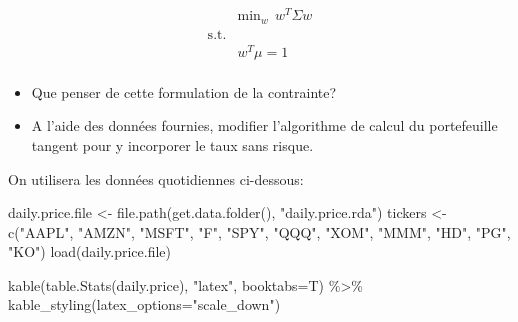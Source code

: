 \documentclass[
]{article}
\newenvironment{Shaded}{\begin{snugshade}}{\end{snugshade}}
\newcommand{\AttributeTok}[1]{\textcolor[rgb]{0.77,0.63,0.00}{#1}}
\newcommand{\FunctionTok}[1]{\textcolor[rgb]{0.00,0.00,0.00}{#1}}
\newcommand{\NormalTok}[1]{#1}
\newcommand{\OtherTok}[1]{\textcolor[rgb]{0.56,0.35,0.01}{#1}}
\newcommand{\SpecialCharTok}[1]{\textcolor[rgb]{0.00,0.00,0.00}{#1}}
\newcommand{\StringTok}[1]{\textcolor[rgb]{0.31,0.60,0.02}{#1}}
\providecommand{\tightlist}{%
  \setlength{\itemsep}{0pt}\setlength{\parskip}{0pt}}
\begin{document}
\[
\begin{aligned}
    & \mbox{min}_w \ \   w^T \Sigma w \\
    \mbox{s.t.} & \\
    & w^T \mu = 1 \\
\end{aligned}
\]

\begin{itemize}
\tightlist
\item
  Que penser de cette formulation de la contrainte?
\item
  A l'aide des données fournies, modifier l'algorithme de calcul du
  portefeuille tangent pour y incorporer le taux sans risque.
\end{itemize}

On utilisera les données quotidiennes ci-dessous:

\begin{Shaded}
\begin{Highlighting}[]
\NormalTok{daily.price.file }\OtherTok{\textless{}{-}} \FunctionTok{file.path}\NormalTok{(}\FunctionTok{get.data.folder}\NormalTok{(), }\StringTok{"daily.price.rda"}\NormalTok{)}
\NormalTok{tickers }\OtherTok{\textless{}{-}} \FunctionTok{c}\NormalTok{(}\StringTok{"AAPL"}\NormalTok{, }\StringTok{"AMZN"}\NormalTok{, }\StringTok{"MSFT"}\NormalTok{, }\StringTok{"F"}\NormalTok{, }\StringTok{"SPY"}\NormalTok{, }\StringTok{"QQQ"}\NormalTok{, }\StringTok{"XOM"}\NormalTok{, }\StringTok{"MMM"}\NormalTok{, }\StringTok{"HD"}\NormalTok{, }\StringTok{"PG"}\NormalTok{, }\StringTok{"KO"}\NormalTok{)}
\FunctionTok{load}\NormalTok{(daily.price.file)}
\end{Highlighting}
\end{Shaded}

\begin{Shaded}
\begin{Highlighting}[]
\FunctionTok{kable}\NormalTok{(}\FunctionTok{table.Stats}\NormalTok{(daily.price), }\StringTok{"latex"}\NormalTok{, }\AttributeTok{booktabs=}\NormalTok{T) }\SpecialCharTok{\%\textgreater{}\%} \FunctionTok{kable\_styling}\NormalTok{(}\AttributeTok{latex\_options=}\StringTok{"scale\_down"}\NormalTok{)}
\end{Highlighting}
\end{Shaded}
\end{document}
